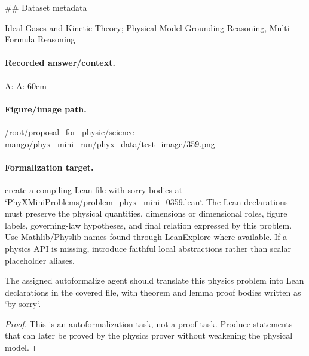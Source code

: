 \#\# Dataset metadata

Ideal Gases and Kinetic Theory; Physical Model Grounding Reasoning, Multi-Formula Reasoning

\paragraph{Recorded answer/context.}
A: A: 60cm

\paragraph{Figure/image path.}
/root/proposal\_for\_physic/science-mango/phyx\_mini\_run/phyx\_data/test\_image/359.png

\paragraph{Formalization target.}
create a compiling Lean file with sorry bodies at `PhyXMiniProblems/problem\_phyx\_mini\_0359.lean`. The Lean declarations must preserve the physical quantities, dimensions or dimensional roles, figure labels, governing-law hypotheses, and final relation expressed by this problem.
Use Mathlib/Physlib names found through LeanExplore where available. If a physics API is missing, introduce faithful local abstractions rather than scalar placeholder aliases.

\begin{theorem}
\label{thm:physics:phyx_mini_0359:target}
The assigned autoformalize agent should translate this physics problem into Lean declarations in the covered file, with theorem and lemma proof bodies written as `by sorry`.
\end{theorem}
\begin{proof}
This is an autoformalization task, not a proof task. Produce statements that can later be proved by the physics prover without weakening the physical model.
\end{proof}

